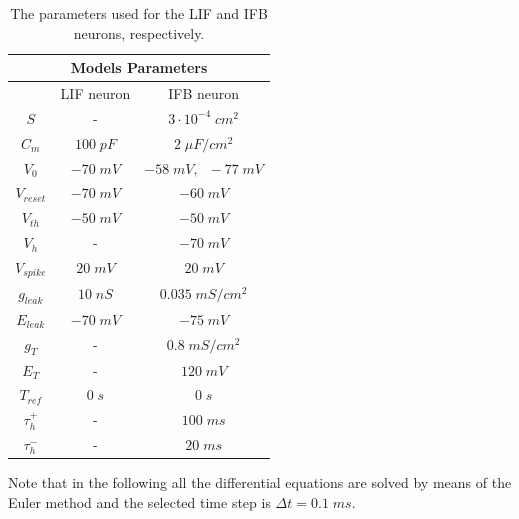 \documentclass[10.5pt]{article}
\begin{document}
\begin{table}[!h]
    \begin{center}
        \begin{tabular}{ |c||c|c|  }
            \hline
            \multicolumn{3}{|c|}{Models Parameters}                      \\
            \hline
            {}               & LIF neuron  & IFB neuron                  \\
            \hline
            \(S\)            & -           & \(3\cdot{10^{-4}}\;cm^{2}\) \\
            \(C_{m}\)        & \(100\;pF\) & \(2\;\mu{F}/cm^{2}\)        \\
            \(V_{0}\)        & \(-70\;mV\) & \(-58\;mV,\;\;-77\;mV\)     \\
            \(V_{reset}\)    & \(-70\;mV\) & \(-60\;mV\)                 \\
            \(V_{th}\)       & \(-50\;mV\) & \(-50\;mV\)                 \\
            \(V_{h}\)        & -           & \(-70\;mV\)                 \\
            \(V_{spike}\)    & \(20\;mV\)  & \(20\;mV\)                  \\
            \(g_{leak}\)     & \(10\;nS\)  & \(0.035\;mS/cm^{2}\)        \\
            \(E_{leak}\)     & \(-70\;mV\) & \(-75\;mV\)                 \\
            \(g_{T}\)        & -           & \(0.8\;mS/cm^{2}\)          \\
            \(E_{T}\)        & -           & \(120\;mV\)                 \\
            \(T_{ref}\)      & \(0\;s\)    & \(0\;s\)                    \\
            \(\tau_{h}^{+}\) & -           & \(100\;ms\)                 \\
            \(\tau_{h}^{-}\) & -           & \(20\;ms\)                  \\
            \hline
        \end{tabular}
        \caption{\label{table:parameters}The parameters used for the LIF and IFB neurons, respectively.}
    \end{center}
\end{table}

Note that in the following all the differential equations are solved by means of the Euler
method and the selected time step is \(\Delta{t}=0.1\;ms\).
\end{document}
